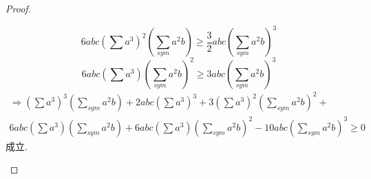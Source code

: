\documentclass[]{article}
\begin{document}
{\begin{proof}
\begin{enumerate}
\begin{equation}
    \end{equation}
    \begin{equation}\nonumber
        6abc(\sum a^3)^2(\sum_{sym}a^2b)\geq \frac{3}{2}abc(\sum_{sym}a^2b)^3
    \end{equation}
    \begin{equation}\nonumber
        6abc(\sum a^3)(\sum_{sym}a^2b)^2\geq 3abc(\sum_{sym}a^2b)^3
    \end{equation}
    \begin{equation}\nonumber
        \begin{split}
            \Longrightarrow (\sum a^3)^3(\sum_{sym}a^2b)+2abc(\sum a^3)^3+3(\sum a^3)^2(\sum_{sym}a^2b)^2+\\6abc(\sum a^3)(\sum_{sym}a^2b)+6abc(\sum a^3)(\sum_{sym}a^2b)^2-10abc(\sum_{sym}a^2b)^3\geq 0
        \end{split}
    \end{equation}
    成立.
\end{enumerate}
\end{proof}
}
\end{document}
